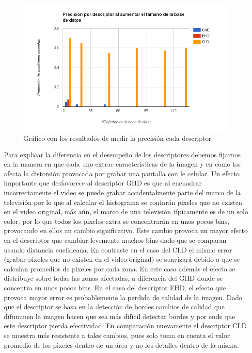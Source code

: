 	\begin{figure}[!h]
		\centering
		\includegraphics[width=\textwidth]{imagenes/cap5/resultados_precision.png}
		\caption{Gráfico con los resultados de medir la precisión cada descriptor}
		\label{resultados_precision}
	\end{figure}

Para explicar la diferencia en el desempeño de los descriptores debemos fijarnos en la manera en que cada uno extrae características de la imagen y en como los afecta la distorsión provocada por grabar una pantalla con le celular. Un efecto importante que desfavorece al descriptor GHD es que al encuadrar incorrectamente el video se puede grabar accidentalmente parte del marco de la televisión por lo que al calcular el histograma se contarán pixeles que no existen en el video original, más aún, el marco de una televisión típicamente es de un solo color, por lo que todos los pixeles extra se concentrarán en unos pocos bins, provocando en ellos un cambio significativo. Este cambio provoca un mayor efecto en el descriptor que cambiar levemente muchos bins dado que se comparan usando distancia euclideana. En contraste en el caso del CLD el mismo error (grabar pixeles que no existen en el video original) se suavizará debido a que se calculan promedios de pixeles por cada zona. En este caso además el efecto se distribuye sobre todas las zonas afectadas, a diferencia del GHD donde se concentra en unos pocos bins. 
En el caso del descriptor EHD, el efecto que provoca mayor error es probablemente la perdida de calidad de la imagen. Dado que el descriptor se basa en la detección de bordes cambios de calidad que difuminen la imagen hacen que sea más difícil detectar bordes y por ende que este descriptor pierda efectividad. En comparación nuevamente el descriptor CLD se muestra más resistente a tales cambios, pues solo toma en cuenta el valor promedio de los pixeles dentro de un área y no los detalles dentro de la misma.

